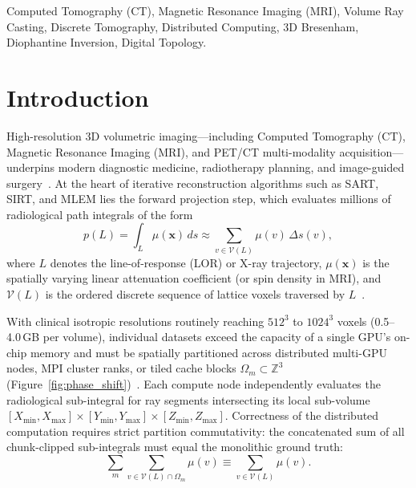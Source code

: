 \documentclass[conference]{IEEEtran}
\begin{document}
\begin{IEEEkeywords}
Computed Tomography (CT), Magnetic Resonance Imaging (MRI), Volume Ray Casting, Discrete Tomography, Distributed Computing, 3D Bresenham, Diophantine Inversion, Digital Topology.
\end{IEEEkeywords}

\section{Introduction}
\label{sec:intro}

High-resolution 3D volumetric imaging---including Computed Tomography (CT), Magnetic Resonance Imaging (MRI), and PET/CT multi-modality acquisition---underpins modern diagnostic medicine, radiotherapy planning, and image-guided surgery~\cite{feldkamp1984practical,siddon1985fast,jacobs1998fast,long2010separable,kim2024heterogeneous,zhang2023distributed,wang2025distributed,liu2026ultra}. At the heart of iterative reconstruction algorithms such as SART, SIRT, and MLEM lies the forward projection step, which evaluates millions of radiological path integrals of the form
\begin{equation}
    \label{eq:radon_integral}
    p(L) = \int_L \mu(\mathbf{x}) \, ds \approx \sum_{v \in \mathcal{V}(L)} \mu(v) \, \Delta s(v),
\end{equation}
where $L$ denotes the line-of-response (LOR) or X-ray trajectory, $\mu(\mathbf{x})$ is the spatially varying linear attenuation coefficient (or spin density in MRI), and $\mathcal{V}(L)$ is the ordered discrete sequence of lattice voxels traversed by $L$~\cite{siddon1985fast,li2020gpu,chen2023exact,muller2025gecco}.

With clinical isotropic resolutions routinely reaching $512^3$ to $1024^3$ voxels (0.5--4.0\,GB per volume), individual datasets exceed the capacity of a single GPU's on-chip memory and must be spatially partitioned across distributed multi-GPU nodes, MPI cluster ranks, or tiled cache blocks $\Omega_m \subset \mathbb{Z}^3$ (Figure~\ref{fig:phase_shift})~\cite{zhang2023distributed,song2023differentiable,wang2025distributed}. Each compute node independently evaluates the radiological sub-integral for ray segments intersecting its local sub-volume $[X_{\min}, X_{\max}] \times [Y_{\min}, Y_{\max}] \times [Z_{\min}, Z_{\max}]$. Correctness of the distributed computation requires strict partition commutativity: the concatenated sum of all chunk-clipped sub-integrals must equal the monolithic ground truth:
\begin{equation}
    \label{eq:commutativity_integral}
    \sum_{m} \sum_{v \in \mathcal{V}(L) \cap \Omega_m} \mu(v) \equiv \sum_{v \in \mathcal{V}(L)} \mu(v).
\end{equation}
\end{document}
